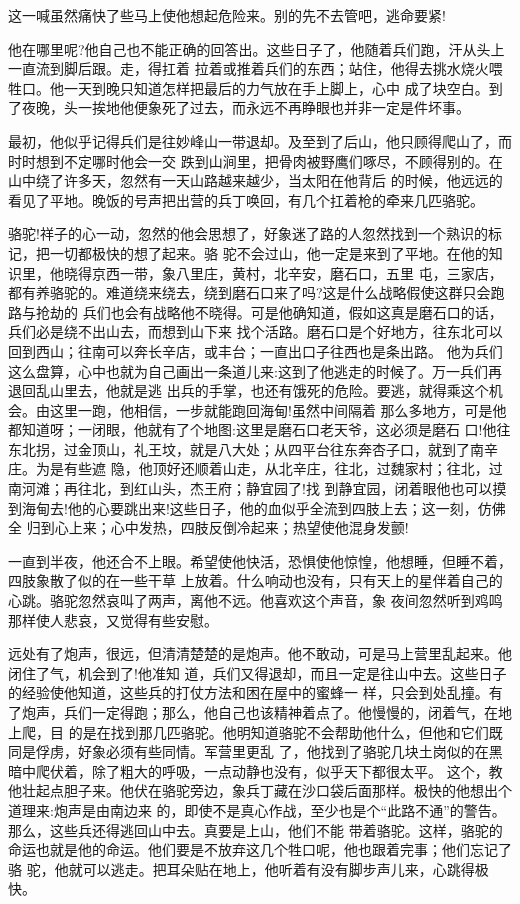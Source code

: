 \documentclass[11pt,a4paper,onecolumn]{article}
\begin{document}
这一喊\myrule 虽然痛快了些\myrule 马上使他想起危险来。别的先不去管吧，逃命要紧!

他在哪里呢?他自己也不能正确的回答出。这些日子了，他随着兵们跑，汗从头上一直流到脚后跟。走，得扛着
拉着或推着兵们的东西；站住，他得去挑水烧火喂牲口。他一天到晚只知道怎样把最后的力气放在手上脚上，心中
成了块空白。到了夜晚，头一挨地他便象死了过去，而永远不再睁眼也并非一定是件坏事。

最初，他似乎记得兵们是往妙峰山一带退却。及至到了后山，他只顾得爬山了，而时时想到不定哪时他会一交
跌到山涧里，把骨肉被野鹰们啄尽，不顾得别的。在山中绕了许多天，忽然有一天山路越来越少，当太阳在他背后
的时候，他远远的看见了平地。晚饭的号声把出营的兵丁唤回，有几个扛着枪的牵来几匹骆驼。

骆驼!祥子的心一动，忽然的他会思想了，好象迷了路的人忽然找到一个熟识的标记，把一切都极快的想了起来。骆
驼不会过山，他一定是来到了平地。在他的知识里，他晓得京西一带，象八里庄，黄村，北辛安，磨石口，五里
屯，三家店，都有养骆驼的。难道绕来绕去，绕到磨石口来了吗?这是什么战略\myrule 假使这群只会跑路与抢劫的
兵们也会有战略\myrule 他不晓得。可是他确知道，假如这真是磨石口的话，兵们必是绕不出山去，而想到山下来
找个活路。磨石口是个好地方，往东北可以回到西山；往南可以奔长辛店，或丰台；一直出口子往西也是条出路。
他为兵们这么盘算，心中也就为自己画出一条道儿来:这到了他逃走的时候了。万一兵们再退回乱山里去，他就是逃
出兵的手掌，也还有饿死的危险。要逃，就得乘这个机会。由这里一跑，他相信，一步就能跑回海甸!虽然中间隔着
那么多地方，可是他都知道呀；一闭眼，他就有了个地图:这里是磨石口\myrule 老天爷，这必须是磨石
口!\myrule 他往东北拐，过金顶山，礼王坟，就是八大处；从四平台往东奔杏子口，就到了南辛庄。为是有些遮
隐，他顶好还顺着山走，从北辛庄，往北，过魏家村；往北，过南河滩；再往北，到红山头，杰王府；静宜园了!找
到静宜园，闭着眼他也可以摸到海甸去!他的心要跳出来!这些日子，他的血似乎全流到四肢上去；这一刻，仿佛全
归到心上来；心中发热，四肢反倒冷起来；热望使他混身发颤!

一直到半夜，他还合不上眼。希望使他快活，恐惧使他惊惶，他想睡，但睡不着，四肢象散了似的在一些干草
上放着。什么响动也没有，只有天上的星伴着自己的心跳。骆驼忽然哀叫了两声，离他不远。他喜欢这个声音，象
夜间忽然听到鸡鸣那样使人悲哀，又觉得有些安慰。

远处有了炮声，很远，但清清楚楚的是炮声。他不敢动，可是马上营里乱起来。他闭住了气，机会到了!他准知
道，兵们又得退却，而且一定是往山中去。这些日子的经验使他知道，这些兵的打仗方法和困在屋中的蜜蜂一
样，只会到处乱撞。有了炮声，兵们一定得跑；那么，他自己也该精神着点了。他慢慢的，闭着气，在地上爬，目
的是在找到那几匹骆驼。他明知道骆驼不会帮助他什么，但他和它们既同是俘虏，好象必须有些同情。军营里更乱
了，他找到了骆驼\myrule 几块土岗似的在黑暗中爬伏着，除了粗大的呼吸，一点动静也没有，似乎天下都很太平。
这个，教他壮起点胆子来。他伏在骆驼旁边，象兵丁藏在沙口袋后面那样。极快的他想出个道理来:炮声是由南边来
的，即使不是真心作战，至少也是个``此路不通''的警告。那么，这些兵还得逃回山中去。真要是上山，他们不能
带着骆驼。这样，骆驼的命运也就是他的命运。他们要是不放弃这几个牲口呢，他也跟着完事；他们忘记了骆
驼，他就可以逃走。把耳朵贴在地上，他听着有没有脚步声儿来，心跳得极快。
\end{document}
